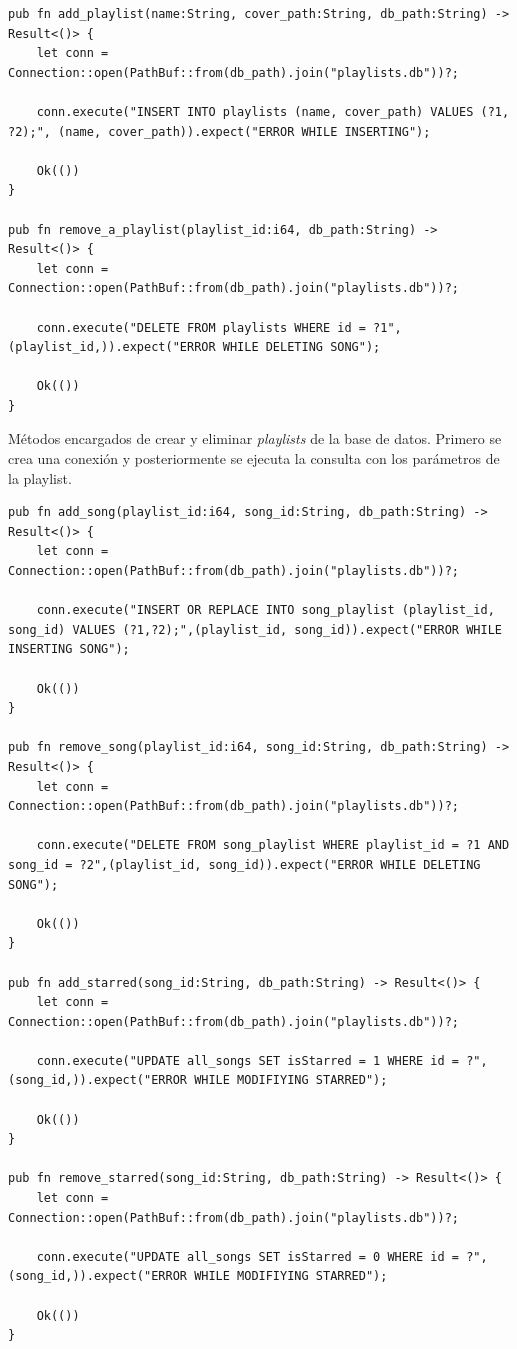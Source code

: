 \documentclass[11pt, a4paper]{article}
\begin{document}
            \begin{lstlisting}[caption={Operaciones CRUD playlist}]
pub fn add_playlist(name:String, cover_path:String, db_path:String) -> Result<()> {
    let conn = Connection::open(PathBuf::from(db_path).join("playlists.db"))?;

    conn.execute("INSERT INTO playlists (name, cover_path) VALUES (?1, ?2);", (name, cover_path)).expect("ERROR WHILE INSERTING");

    Ok(())
}

pub fn remove_a_playlist(playlist_id:i64, db_path:String) -> Result<()> {
    let conn = Connection::open(PathBuf::from(db_path).join("playlists.db"))?;

    conn.execute("DELETE FROM playlists WHERE id = ?1",(playlist_id,)).expect("ERROR WHILE DELETING SONG");

    Ok(())
}
            \end{lstlisting}

            Métodos encargados de crear y eliminar \textit{playlists} de la base de datos. Primero se crea una conexión y posteriormente se ejecuta la consulta con los parámetros de la playlist.

            \begin{lstlisting}[caption={Operaciones CRUD canciones}]
pub fn add_song(playlist_id:i64, song_id:String, db_path:String) -> Result<()> {
    let conn = Connection::open(PathBuf::from(db_path).join("playlists.db"))?;

    conn.execute("INSERT OR REPLACE INTO song_playlist (playlist_id, song_id) VALUES (?1,?2);",(playlist_id, song_id)).expect("ERROR WHILE INSERTING SONG");

    Ok(())
}

pub fn remove_song(playlist_id:i64, song_id:String, db_path:String) -> Result<()> {
    let conn = Connection::open(PathBuf::from(db_path).join("playlists.db"))?;

    conn.execute("DELETE FROM song_playlist WHERE playlist_id = ?1 AND song_id = ?2",(playlist_id, song_id)).expect("ERROR WHILE DELETING SONG");

    Ok(())
}

pub fn add_starred(song_id:String, db_path:String) -> Result<()> {
    let conn = Connection::open(PathBuf::from(db_path).join("playlists.db"))?;

    conn.execute("UPDATE all_songs SET isStarred = 1 WHERE id = ?",(song_id,)).expect("ERROR WHILE MODIFIYING STARRED");

    Ok(())
}

pub fn remove_starred(song_id:String, db_path:String) -> Result<()> {
    let conn = Connection::open(PathBuf::from(db_path).join("playlists.db"))?;

    conn.execute("UPDATE all_songs SET isStarred = 0 WHERE id = ?",(song_id,)).expect("ERROR WHILE MODIFIYING STARRED");

    Ok(())
}
            \end{lstlisting}
\end{document}
